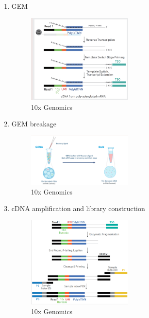 \begin{enumerate}
\def\labelenumi{\arabic{enumi}.}
\item
  GEM

  \begin{figure}
  \centering
  \includegraphics[width=0.5\textwidth]{images/Screenshot_6.png}
  \caption{10x Genomics}
  \end{figure}
\item
  GEM breakage

  \begin{figure}
  \centering
  \includegraphics[width=0.5\textwidth]{images/Screenshot_7.png}
  \caption{10x Genomics}
  \end{figure}
\item
  cDNA amplification and library construction

  \begin{figure}
  \centering
  \includegraphics[width=0.5\textwidth]{images/Screenshot_8.png}
  \caption{10x Genomics}
  \end{figure}
\end{enumerate}

